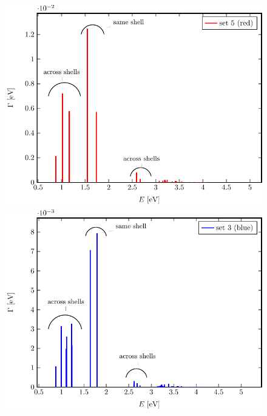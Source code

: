 


\begin{figure}[h]
 \centering
 \includegraphics[width=\columnwidth]{pics/rot.pdf}\\
 \includegraphics[width=\columnwidth]{pics/blue.pdf}

\end{figure}
